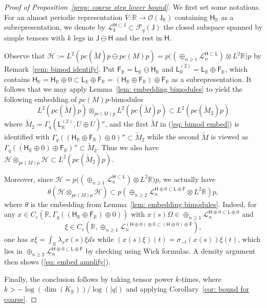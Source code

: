 \documentclass[a4paper,11pt]{amsart}
\theoremstyle{definition}
\newcommand{\R}{{\mathbb R}}
\newcommand{\cF}{{\mathcal F}}
\newcommand{\cH}{{\mathcal H}}
\newcommand{\cL}{{\mathcal L}}
\newcommand{\cO}{{\mathcal O}}
\newcommand{\sH}{\mathsf{H}}
\newcommand{\sL}{\mathsf{L}}
\newcommand{\sF}{\mathsf{F}}
\newcommand{\ot}{\otimes}
\begin{document}
\begin{proof}[Proof of Proposition~\ref{prop: coarse step lower bound}]
We first set some notations.
For an almost periodic representation $V:\R\to \cO(\mathsf J_\R)$ containing $\sH_\R$ as a subrepresentation,
	we denote by $\cL_k^{\sH\subset \mathsf J}\subset \cF_q(\mathsf J)$ the closed subspace spanned by simple tensors with $k$ legs in $\mathsf J\ominus \sH$
		and the rest in $\sH$.
	
Observe that $\cH:=L^2(p c(\tilde M)p\ominus pc(M) p)=p\big( (\oplus_{n\geq 1}\cL_n^{\sH\subset \sL})\ot L^2\R \big)p$
	by Remark~\ref{rem: bimod identify}. 
Put $\sF_\R= \sL_\R\ominus \sH_\R$ 
	and $\sL^{(2)}_\R=\sL_\R\oplus \sF_\R$, which contains $\sH_\R=\sH_\R\oplus 0\subset \sL_\R\oplus \sF_\R=(\sH_\R\oplus \sF_\R)\oplus \sF_\R$ as a subrepresentation.
It follows that we may apply Lemma~\ref{lem: embedding bimodules} to yield the following embedding of $p c(M) p$-bimodules
\begin{equation}\label{eq: bimod embed}
	L^2(p c(\tilde M) p)\ot_{pc(M)p} L^2(pc(\tilde M)p)\subset L^2(p c(\tilde M_2)p)
\end{equation}
	where $\tilde M_2=\Gamma_q(\sL_\R^{(2)}, U\oplus U)''$,
	and the first $\tilde M$ in (\ref{eq: bimod embed}) is identified with 
	$\Gamma_q((\sH_\R\oplus \sF_\R)\oplus 0)''\subset \tilde M_2$
	while the second $\tilde M$ is viewed as $\Gamma_q((\sH_\R\oplus 0)\oplus \sF_\R)''\subset \tilde M_2$.
Thus we also have $\cH\ot _{p c(M)p}\cH\subset L^2(p c(\tilde M_2) p)$.

Moreover, since $\cH=p\big( (\oplus_{n\geq 1}\cL_n^{\sH\subset \sL})\ot L^2\R \big)p$,
	we actually have
\begin{equation}\label{eq: embed amplify}
	\theta(\cH\ot_{p c(M)p}\cH)\subset p(\oplus_{n\geq 2}\cL_n^{\sH\oplus 0\subset \sL\oplus \sF}\ot L^2\R )p,
\end{equation}
	where $\theta$ is the embedding from Lemma~\ref{lem: embedding bimodules}.
Indeed, for any $x\in C_c(\R, \Gamma_q((\sH_\R\oplus \sF_\R) \oplus 0))$ with $x(s)\Omega\in \oplus_{n\geq 1} \cL_n^{\sH\oplus 0\subset \sL\oplus 0}$
	and 
	$$
	\xi\in  C_c(\R, \oplus_{n\geq 1} \cL_{n}^{(\sH\oplus 0)\oplus 0\subset (\sH\oplus 0)\oplus \sF}),
	$$
	one has
	$x\xi=\int_{\R} \lambda_s x(s)\xi ds$
	while $(x(s)\xi)(t)=\sigma_{-t}(x(s))\xi(t)$,
	which lies in $\oplus_{n\geq 2}\cL_n^{\sH\oplus 0\subset \sL\oplus \sF}$ by checking using Wick formulas.
A density argument then shows (\ref{eq: embed amplify}).
	
	
Finally, the conclusion follows by taking tensor power $k$-times, where $k> -\log(\dim(K_\R))/\log(|q|)$
	and applying Corollary~\ref{cor: bound for coarse}.
\end{proof}
\end{document}
